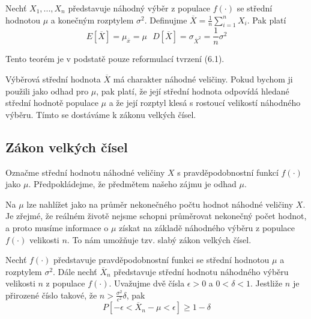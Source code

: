 \begin{theorem}
Nechť $X_1, ..., X_n$ představuje náhodný výběr z populace $f(\cdot)$ se střední hodnotou $\mu$ a konečným rozptylem $\sigma^2$. Definujme $\overline{X} = \frac{1}{n} \sum_{i = 1}^n X_i$. Pak platí
\begin{equation*}
E[\overline{X}] = \mu_{\overline{x}} = \mu ~~~ D[\overline{X}] = \sigma_{\overline{X}^2} = \frac{1}{n} \sigma^2
\end{equation*}
\end{theorem}
Tento teorém je v podstatě pouze reformulací tvrzení (6.1).

Výběrová střední hodnota $\overline{X}$ má charakter náhodné veličiny. Pokud bychom ji použili jako odhad pro $\mu$, pak platí, že její střední hodnota odpovídá hledané střední hodnotě populace $\mu$ a že její rozptyl klesá s rostoucí velikostí náhodného výběru. Tímto se dostáváme k zákonu velkých čísel.

\subsection{Zákon velkých čísel}

Označme střední hodnotu náhodné veličiny $X$ s pravděpodobnostní funkcí $f(\cdot)$ jako $\mu$. Předpokládejme, že předmětem našeho zájmu je odhad $\mu$.

Na $\mu$ lze nahlížet jako na průměr nekonečného počtu hodnot náhodné veličiny $X$. Je zřejmé, že reálném životě nejsme schopni průměrovat nekonečný počet hodnot, a proto musíme informace o $\mu$ získat na základě náhodného výběru z populace $f(\cdot)$ velikosti $n$. To nám umožňuje tzv. slabý zákon velkých čísel.

\begin{theorem}
Nechť $f(\cdot)$ představuje pravděpodobnostní funkci se střední hodnotou $\mu$ a rozptylem $\sigma^2$. Dále nechť $\overline{X}_n$ představuje střední hodnotu náhodného výběru velikosti $n$ z populace $f(\cdot)$. Uvažujme dvě čísla $\epsilon > 0$ a $0 < \delta < 1$. Jestliže $n$ je přirozené číslo takové, že $n > \frac{\sigma^2}{\epsilon^2} \delta$, pak
\begin{equation*}
P[-\epsilon < \overline{X}_n - \mu < \epsilon] \ge 1 - \delta
\end{equation*}  
\end{theorem}  

